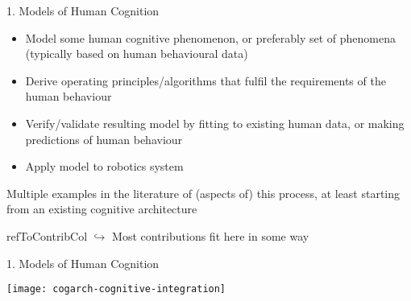 \documentclass[compress]{beamer}
\newcommand{\refToContrib}[1]{%
    \begin{beamercolorbox}[wd=\linewidth,ht=2ex,dp=0.7ex]{refToContribCol}%
    \hspace{0.5em}$\hookrightarrow$ #1%
    \end{beamercolorbox}%
}%
\begin{document}
\begin{frame}{1. Models of Human Cognition}    

    \begin{itemize}
        \item Model some human cognitive phenomenon, or preferably set of phenomena (typically based on human behavioural data)
        \item Derive operating principles/algorithms that fulfil the requirements of the human behaviour
        \item Verify/validate resulting model by fitting to existing human data, or making predictions of human behaviour
        \item Apply model to robotics system
    \end{itemize}
    
    Multiple examples in the literature of (aspects of) this process, at least starting from an existing cognitive architecture
    
    \refToContrib{Most contributions fit here in some way}

\end{frame}


\begin{frame}{1. Models of Human Cognition}    

    \texttt{[image: cogarch-cognitive-integration]}

\end{frame}
\end{document}
